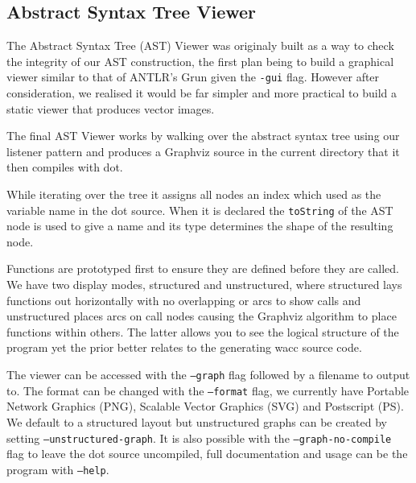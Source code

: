 \subsection*{Abstract Syntax Tree Viewer}

The Abstract Syntax Tree (AST) Viewer was originaly built as a way to check the 
integrity of our AST construction, the first plan being to build a graphical
viewer similar to that of ANTLR's Grun given the \texttt{-gui} flag. However after
consideration, we realised it would be far simpler and more practical to build a
static viewer that produces vector images.

The final AST Viewer works by walking over the abstract syntax tree using our
listener pattern and produces a Graphviz source in the current directory that it
then compiles with dot.

While iterating over the tree it assigns all nodes an index which used as the 
variable name in the dot source. When it is declared the \texttt{toString} of
the AST node is used to give a name and its type determines the shape of the
resulting node.

Functions are prototyped first to ensure they are defined before they are
called. We have two display modes, structured and unstructured, where structured
lays functions out horizontally with no overlapping or arcs to show calls and
unstructured places arcs on call nodes causing the Graphviz algorithm to place
functions within others. The latter allows you to see the logical structure of
the program yet the prior better relates to the generating wacc source code.

The viewer can be accessed with the \texttt{--graph} flag followed by a filename
to output to. The format can be changed with the \texttt{--format} flag, we
currently have Portable Network Graphics (PNG), Scalable Vector Graphics (SVG) 
and Postscript (PS). We default to a structured layout but unstructured graphs 
can be created by setting \texttt{--unstructured-graph}.
It is also possible with the \texttt{--graph-no-compile}
flag to leave the dot source uncompiled, full documentation and usage can be
the program with \texttt{--help}.
